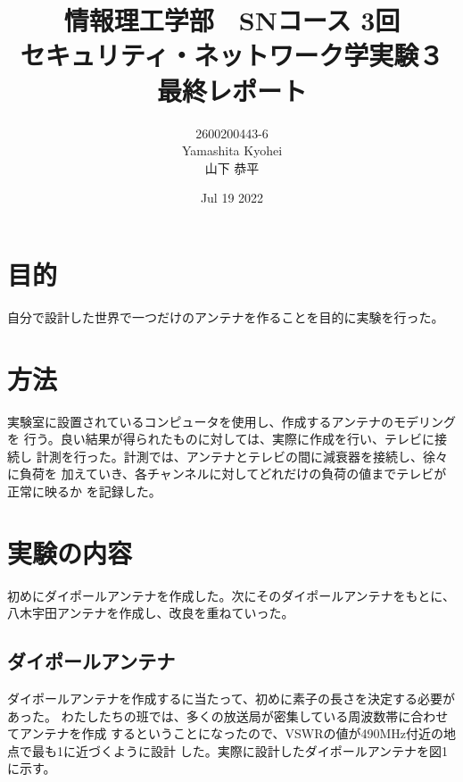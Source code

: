 \documentclass[dvipdfmx,autodetect-engine,titlepage]{jsarticle}
\title{情報理工学部　SNコース 3回\\
セキュリティ・ネットワーク学実験３\\
最終レポート\\}
\author{2600200443-6\\Yamashita Kyohei\\山下 恭平}
\date{Jul 19 2022}
\begin{document}
\maketitle

\section{目的}
自分で設計した世界で一つだけのアンテナを作ることを目的に実験を行った。

\section{方法}
実験室に設置されているコンピュータを使用し、作成するアンテナのモデリングを
行う。良い結果が得られたものに対しては、実際に作成を行い、テレビに接続し
計測を行った。計測では、アンテナとテレビの間に減衰器を接続し、徐々に負荷を
加えていき、各チャンネルに対してどれだけの負荷の値までテレビが正常に映るか
を記録した。


\section{実験の内容}

初めにダイポールアンテナを作成した。次にそのダイポールアンテナをもとに、
八木宇田アンテナを作成し、改良を重ねていった。

\subsection*{ダイポールアンテナ}

ダイポールアンテナを作成するに当たって、初めに素子の長さを決定する必要があった。
わたしたちの班では、多くの放送局が密集している周波数帯に合わせてアンテナを作成
するということになったので、VSWRの値が490MHz付近の地点で最も1に近づくように設計
した。実際に設計したダイポールアンテナを図1に示す。
\end{document}
